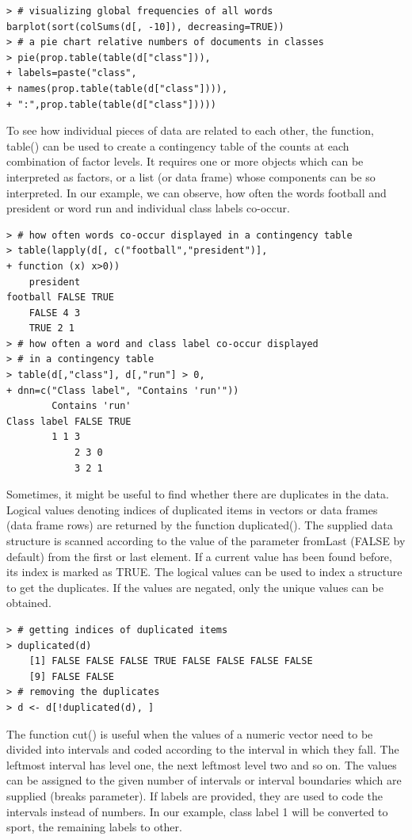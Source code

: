 \documentclass[10pt]{book}
\begin{document}
\begin{verbatim}
> # visualizing global frequencies of all words
barplot(sort(colSums(d[, -10]), decreasing=TRUE))
> # a pie chart relative numbers of documents in classes
> pie(prop.table(table(d["class"])),
+ labels=paste("class",
+ names(prop.table(table(d["class"]))),
+ ":",prop.table(table(d["class"]))))
\end{verbatim}

To see how individual pieces of data are related to each other, the function, table() can be used to create a contingency table of the counts at each combination of factor levels. It requires one or more objects which can be interpreted as factors, or a list (or data frame) whose components can be so interpreted. In our example, we can observe, how often the words football and president or word run and individual class labels co-occur.

\begin{verbatim}
> # how often words co-occur displayed in a contingency table
> table(lapply(d[, c("football","president")],
+ function (x) x>0))
    president
football FALSE TRUE
    FALSE 4 3
    TRUE 2 1
> # how often a word and class label co-occur displayed
> # in a contingency table
> table(d[,"class"], d[,"run"] > 0,
+ dnn=c("Class label", "Contains 'run'"))
        Contains 'run'
Class label FALSE TRUE
        1 1 3
            2 3 0
            3 2 1
\end{verbatim}

Sometimes, it might be useful to find whether there are duplicates in the data. Logical values denoting indices of duplicated items in vectors or data frames (data frame rows) are returned by the function duplicated(). The supplied data structure is scanned according to the value of the parameter fromLast (FALSE by default) from the first or last element. If a current value has been found before, its index is marked as TRUE. The logical values can be used to index a structure to get the duplicates. If the values are negated, only the unique values can be obtained.

\begin{verbatim}
> # getting indices of duplicated items
> duplicated(d)
    [1] FALSE FALSE FALSE TRUE FALSE FALSE FALSE FALSE
    [9] FALSE FALSE
> # removing the duplicates
> d <- d[!duplicated(d), ]
\end{verbatim}

The function cut() is useful when the values of a numeric vector need to be divided into intervals and coded according to the interval in which they fall. The leftmost interval has level one, the next leftmost level two and so on. The values can be assigned to the given number of intervals or interval boundaries which are supplied (breaks parameter). If labels are provided, they are used to code the intervals instead of numbers. In our example, class label 1 will be converted to sport, the remaining labels to other.
\end{document}
